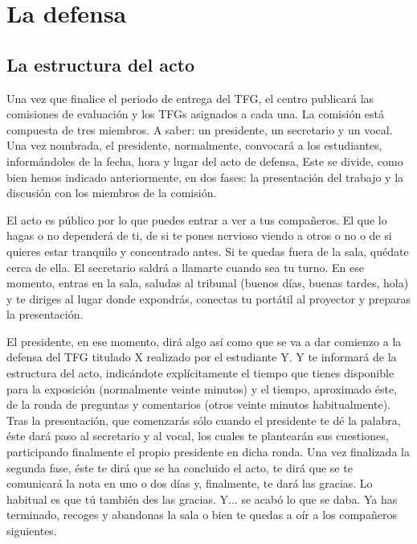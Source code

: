\chapter{La defensa}
\label{cap:Defensa}

\section{La estructura del acto}

Una vez que finalice el periodo de entrega del TFG, el centro publicará las comisiones de evaluación y los TFGs asignados a cada una. La comisión está compuesta de tres miembros. A saber: un presidente, un secretario y un vocal. Una vez nombrada, el presidente, normalmente, convocará a los estudiantes, informándoles de la fecha, hora y lugar del acto de defensa, Este se divide, como bien hemos indicado anteriormente, en dos fases: la presentación del trabajo y la discusión con los miembros de la comisión.

El acto es público por lo que puedes entrar a ver a tus compañeros. El que lo hagas o no dependerá de ti, de si te pones nervioso viendo a otros o no o de si quieres estar tranquilo y concentrado antes. Si te quedas fuera de la sala, quédate cerca de ella. El secretario saldrá a llamarte cuando sea tu turno. En ese momento, entras en la sala, saludas al tribunal (buenos días, buenas tardes, hola) y te diriges al lugar donde expondrás, conectas tu portátil al proyector y preparas la presentación. 

El presidente, en ese momento, dirá algo así como que se va a dar comienzo a la defensa del TFG titulado X realizado por el estudiante Y. Y te informará de la estructura del acto, indicándote explícitamente el tiempo que tienes disponible para la exposición (normalmente veinte minutos) y el tiempo, aproximado éste, de la ronda de preguntas y comentarios (otros veinte minutos habitualmente). Tras la presentación, que comenzarás sólo cuando el presidente te dé la palabra, éste dará paso al secretario y al vocal, los cuales te plantearán sus cuestiones, participando finalmente el propio presidente en dicha ronda. Una vez finalizada la segunda fase, éste te dirá que se ha concluido el acto, te dirá que se te comunicará la nota en uno o dos días y, finalmente, te dará las gracias. Lo habitual es que tú también des las gracias. Y... se acabó lo que se daba. Ya has terminado, recoges y abandonas la sala o bien te quedas a oír a los compañeros siguientes.

